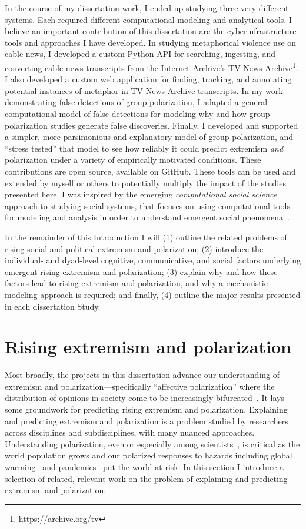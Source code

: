 \documentclass[12pt,letterpaper]{article}
\begin{document}
In the course of my dissertation work, I ended up studying three very 
different systems. Each required different computational modeling and analytical
tools. I believe an important contribution of this dissertation are the
cyberinfrastructure tools and approaches I have developed. In studying
metaphorical violence use on cable news, I developed a custom Python API
for searching, ingesting, and converting cable news transcripts from the
Internet Archive's TV News Archive\footnote{\url{https://archive.org/tv}}. 
I also developed a custom web application for finding, tracking, and annotating 
potential instances of metaphor in TV News Archive transcripts. 
In my work demonstrating false detections of group polarization, I adapted
a general computational model of false detections for modeling why and how
group polarization studies generate false discoveries. Finally, I developed and
supported a simpler, more parsimonious and explanatory model of group polarization,
and ``stress tested'' that model to see how reliably it could predict 
extremism \emph{and} polarization under a variety of empirically motivated
conditions.  These contributions are open
source, available on GitHub. These tools can be used and extended by myself or
others to potentially multiply the impact of the studies presented here.
I was inspired by the emerging \emph{computational social science} approach
to studying social systems, that focuses on using computational tools for
modeling and analysis in order to understand emergent social 
phenomena~\cite{Lazer2009}.

In the remainder of this Introduction I will (1) outline the related problems of
rising social and political extremism and polarization; (2) introduce the 
individual- and dyad-level cognitive, communicative, and social factors 
underlying emergent rising extremism and polarization; (3) explain why and how
these factors lead to rising extremism and polarization, and why a mechanistic
modeling approach is required; and finally, (4) outline the major results 
presented in each dissertation Study.



\section{Rising extremism and polarization}

Most broadly, the projects in this dissertation advance our understanding
of extremism and polarization---specifically ``affective polarization'' where
the distribution of opinions in society come to be increasingly 
bifurcated~\cite{Bramson2016,Iyengar2019}. 
It lays some groundwork for predicting 
rising extremism and polarization. Explaining and predicting 
extremism and polarization is a problem studied by researchers across disciplines
and subdisciplines, with many nuanced approaches. Understanding
polarization, even or especially among scientists~\cite{OConnor2018}, 
is critical as the world population
grows and our polarized responses to hazards 
including global warming~\cite{Cook2016} and pandemics~\cite{Green2020} 
put the world at risk. 
In this section I introduce a selection of related, relevant work on the 
problem of explaining and predicting extremism and polarization.
\end{document}
